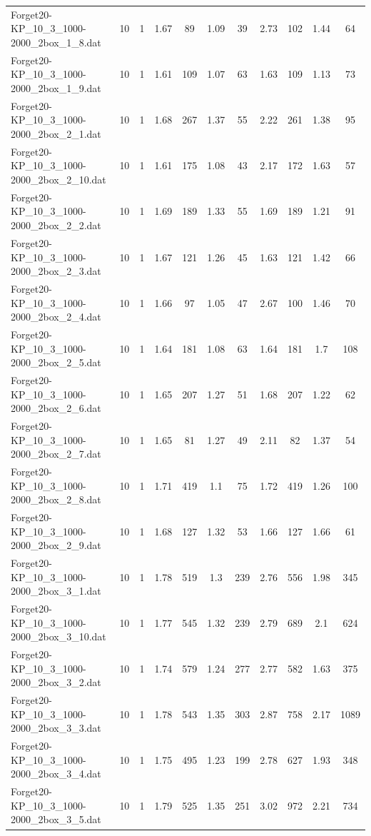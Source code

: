 \begin{table}[!ht]
\begin{tabular}{lcccccccccc}
Forget20-KP\_10\_3\_1000-2000\_2box\_1\_8.dat & 10 & 1 & 1.67 & 89 & 1.09 & 39 & 2.73 & 102 & 1.44 & 64 \\
Forget20-KP\_10\_3\_1000-2000\_2box\_1\_9.dat & 10 & 1 & 1.61 & 109 & 1.07 & 63 & 1.63 & 109 & 1.13 & 73 \\
Forget20-KP\_10\_3\_1000-2000\_2box\_2\_1.dat & 10 & 1 & 1.68 & 267 & 1.37 & 55 & 2.22 & 261 & 1.38 & 95 \\
Forget20-KP\_10\_3\_1000-2000\_2box\_2\_10.dat & 10 & 1 & 1.61 & 175 & 1.08 & 43 & 2.17 & 172 & 1.63 & 57 \\
Forget20-KP\_10\_3\_1000-2000\_2box\_2\_2.dat & 10 & 1 & 1.69 & 189 & 1.33 & 55 & 1.69 & 189 & 1.21 & 91 \\
Forget20-KP\_10\_3\_1000-2000\_2box\_2\_3.dat & 10 & 1 & 1.67 & 121 & 1.26 & 45 & 1.63 & 121 & 1.42 & 66 \\
Forget20-KP\_10\_3\_1000-2000\_2box\_2\_4.dat & 10 & 1 & 1.66 & 97 & 1.05 & 47 & 2.67 & 100 & 1.46 & 70 \\
Forget20-KP\_10\_3\_1000-2000\_2box\_2\_5.dat & 10 & 1 & 1.64 & 181 & 1.08 & 63 & 1.64 & 181 & 1.7 & 108 \\
Forget20-KP\_10\_3\_1000-2000\_2box\_2\_6.dat & 10 & 1 & 1.65 & 207 & 1.27 & 51 & 1.68 & 207 & 1.22 & 62 \\
Forget20-KP\_10\_3\_1000-2000\_2box\_2\_7.dat & 10 & 1 & 1.65 & 81 & 1.27 & 49 & 2.11 & 82 & 1.37 & 54 \\
Forget20-KP\_10\_3\_1000-2000\_2box\_2\_8.dat & 10 & 1 & 1.71 & 419 & 1.1 & 75 & 1.72 & 419 & 1.26 & 100 \\
Forget20-KP\_10\_3\_1000-2000\_2box\_2\_9.dat & 10 & 1 & 1.68 & 127 & 1.32 & 53 & 1.66 & 127 & 1.66 & 61 \\
Forget20-KP\_10\_3\_1000-2000\_2box\_3\_1.dat & 10 & 1 & 1.78 & 519 & 1.3 & 239 & 2.76 & 556 & 1.98 & 345 \\
Forget20-KP\_10\_3\_1000-2000\_2box\_3\_10.dat & 10 & 1 & 1.77 & 545 & 1.32 & 239 & 2.79 & 689 & 2.1 & 624 \\
Forget20-KP\_10\_3\_1000-2000\_2box\_3\_2.dat & 10 & 1 & 1.74 & 579 & 1.24 & 277 & 2.77 & 582 & 1.63 & 375 \\
Forget20-KP\_10\_3\_1000-2000\_2box\_3\_3.dat & 10 & 1 & 1.78 & 543 & 1.35 & 303 & 2.87 & 758 & 2.17 & 1089 \\
Forget20-KP\_10\_3\_1000-2000\_2box\_3\_4.dat & 10 & 1 & 1.75 & 495 & 1.23 & 199 & 2.78 & 627 & 1.93 & 348 \\
Forget20-KP\_10\_3\_1000-2000\_2box\_3\_5.dat & 10 & 1 & 1.79 & 525 & 1.35 & 251 & 3.02 & 972 & 2.21 & 734 \\

\end{tabular}
\end{table}
